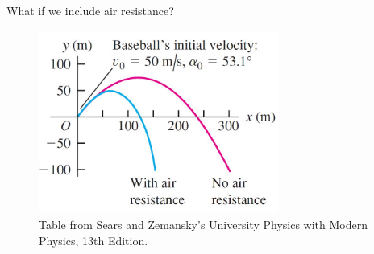 \documentclass[]{beamer}
\begin{document}
\begin{frame}
   
  What if we include air resistance?
   \pause


           \begin{figure}[h!]  
            \includegraphics[width=0.7\textwidth]{images/22.jpg}
             \caption{ {\tiny Table from Sears and Zemansky's University Physics 
             with Modern Physics, 13th Edition.} }
          \end{figure}
            

     
     \end{frame}




\end{document}
